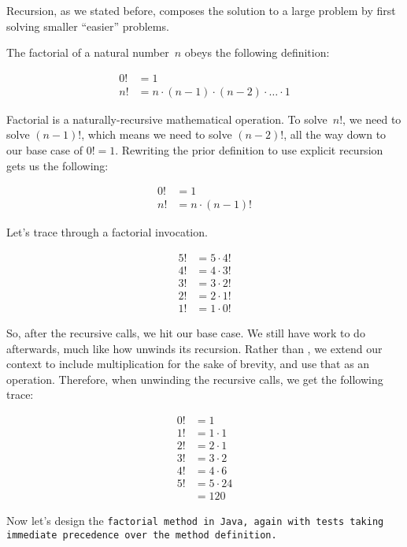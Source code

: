Recursion, as we stated before, composes the solution to a large problem by first solving smaller ``easier'' problems.

The factorial of a natural number~$n$ obeys the following definition:

\begin{align*}
    0! &= 1\\
    n! &= n \cdot (n - 1) \cdot (n - 2) \cdot \ldots \cdot 1
\end{align*}

Factorial is a naturally-recursive mathematical operation. 
To solve~$n!$, we need to solve $(n-1)!$, which means we need to solve $(n-2)!$, all the way down to our base case of $0!=1$. 
Rewriting the prior definition to use explicit recursion gets us the following: \

\begin{align*}
    0! &= 1\\
    n! &= n \cdot (n - 1)!
\end{align*}

Let's trace through a factorial invocation.

\begin{align*}
    5! &= 5 \cdot 4!\\
    4! &= 4 \cdot 3!\\
    3! &= 3 \cdot 2!\\
    2! &= 2 \cdot 1!\\
    1! &= 1 \cdot 0!
\end{align*}

So, after the recursive calls, we hit our base case. 
We still have work to do afterwards, much like how  unwinds its recursion. 
Rather than , we extend our context to include multiplication for the sake of brevity, and use that as an operation. 
Therefore, when unwinding the recursive calls, we get the following trace:

\begin{align*}
0! &= 1\\
1! &= 1 \cdot 1\\
2! &= 2 \cdot 1\\
3! &= 3 \cdot 2\\
4! &= 4 \cdot 6\\
5! &= 5 \cdot 24\\
   &= 120
\end{align*}

Now let's design the \tt{factorial} method in Java, again with tests taking immediate precedence over the method definition.

